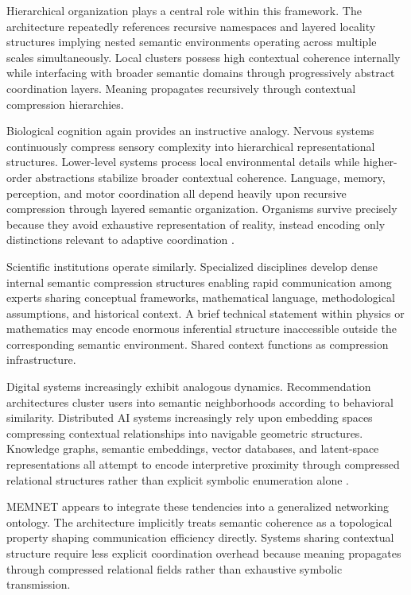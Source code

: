\documentclass[11pt,a4paper]{article}
\begin{document}
Hierarchical organization plays a central role within this framework. The architecture repeatedly references recursive namespaces and layered locality structures implying nested semantic environments operating across multiple scales simultaneously. Local clusters possess high contextual coherence internally while interfacing with broader semantic domains through progressively abstract coordination layers. Meaning propagates recursively through contextual compression hierarchies.

Biological cognition again provides an instructive analogy. Nervous systems continuously compress sensory complexity into hierarchical representational structures. Lower-level systems process local environmental details while higher-order abstractions stabilize broader contextual coherence. Language, memory, perception, and motor coordination all depend heavily upon recursive compression through layered semantic organization. Organisms survive precisely because they avoid exhaustive representation of reality, instead encoding only distinctions relevant to adaptive coordination \cite{friston2010}.

Scientific institutions operate similarly. Specialized disciplines develop dense internal semantic compression structures enabling rapid communication among experts sharing conceptual frameworks, mathematical language, methodological assumptions, and historical context. A brief technical statement within physics or mathematics may encode enormous inferential structure inaccessible outside the corresponding semantic environment. Shared context functions as compression infrastructure.

Digital systems increasingly exhibit analogous dynamics. Recommendation architectures cluster users into semantic neighborhoods according to behavioral similarity. Distributed AI systems increasingly rely upon embedding spaces compressing contextual relationships into navigable geometric structures. Knowledge graphs, semantic embeddings, vector databases, and latent-space representations all attempt to encode interpretive proximity through compressed relational structures rather than explicit symbolic enumeration alone \cite{semanticweb}.

MEMNET appears to integrate these tendencies into a generalized networking ontology. The architecture implicitly treats semantic coherence as a topological property shaping communication efficiency directly. Systems sharing contextual structure require less explicit coordination overhead because meaning propagates through compressed relational fields rather than exhaustive symbolic transmission.
\end{document}
